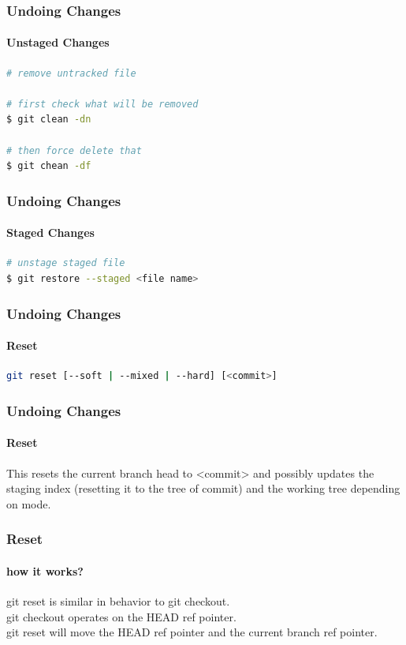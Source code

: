 \documentclass{beamer}
\begin{document}
	\begin{frame}[fragile]
		\frametitle{Undoing Changes}
		\framesubtitle{Unstaged Changes}
		
\begin{lstlisting}[language=bash]
# remove untracked file

# first check what will be removed
$ git clean -dn

# then force delete that
$ git chean -df
\end{lstlisting}
	\end{frame}
	
	\begin{frame}[fragile]
		\frametitle{Undoing Changes}
		\framesubtitle{Staged Changes}
		
\begin{lstlisting}[language=bash]
# unstage staged file
$ git restore --staged <file name>
\end{lstlisting}
	\end{frame}
	
	\begin{frame}[fragile]
	\frametitle{Undoing Changes}
	\framesubtitle{Reset}
\begin{lstlisting}[language=bash]
git reset [--soft | --mixed | --hard] [<commit>]
\end{lstlisting}	
	\end{frame}
	
	\begin{frame}
	\frametitle{Undoing Changes}
	\framesubtitle{Reset}
	This resets the \textcolor{secondary}{current branch head} to <commit>
	and possibly updates the 
	\textcolor{secondary}{staging index}
	(resetting it to the tree of  commit)
	and the
	\textcolor{secondary}{working tree}
	depending on
	\textcolor{secondary}{mode}.
	\cite{gitdoc}
	\end{frame}
	
	\begin{frame}
	\frametitle{Reset}
	\framesubtitle{how it works?}
	
	\textcolor{secondary}{git reset} is similar in behavior to \textcolor{secondary}{git checkout}.\\
	 \textcolor{secondary}{git checkout} operates on the \textcolor{secondary}{HEAD ref pointer}.\\
	\textcolor{secondary}{git reset} will move the \textcolor{secondary}{HEAD ref pointer} and the \textcolor{secondary}{current branch ref pointer}. \cite{bitbucket}
	\end{frame}
	
\end{document}
